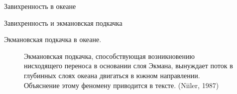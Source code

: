 \begin{chapter}{Завихренность в океане}
\begin{section}{Завихренность и экмановская подкачка}
\begin{paragraph}{Экмановская подкачка в океане.}
\begin{figure}[t]
\caption{Экмановская подкачка, способствующая 
возникновению нисходящего переноса в основании слоя Экмана, 
вынуждает поток в глубинных слоях океана двигаться в южном направлении. 
Объяснение этому феномену приводится в тексте.
(Niiler, 1987) } 
\label{fig:vorticity}
\vfill
\vspace{-3ex}
\end{figure}
\end{paragraph}
%
%


\end{section}
\end{chapter}
